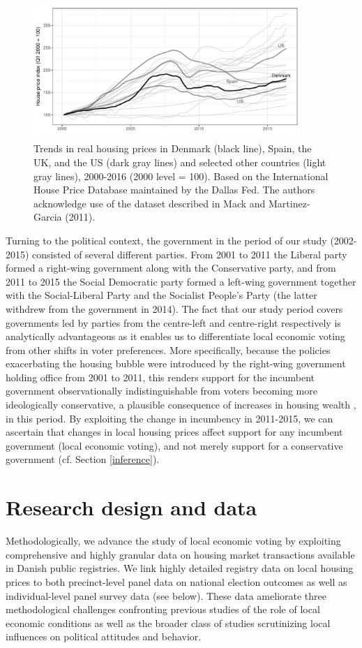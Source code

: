 \documentclass[12pt,a4paper]{article}
\begin{document}
	\begin{figure}[htbp!]
		\includegraphics[width=0.9\textwidth]{../figures/timeplot}
		\centering
		\caption{Trends in real housing prices in Denmark (black line), Spain, the UK, and the US (dark gray lines) and selected other countries (light gray lines), 2000-2016 (2000 level = 100). Based on the International House Price Database maintained by the Dallas Fed. The authors acknowledge use of the dataset described in Mack and Martinez-Garcia (2011).}\label{hpd}
	\end{figure}
	Turning to the political context, the government in the period of our study (2002-2015) consisted of several different parties. From 2001 to 2011 the Liberal party formed a right-wing government along with the Conservative party, and from 2011 to 2015 the Social Democratic party formed a left-wing government together with the Social-Liberal Party and the Socialist People’s Party (the latter withdrew from the government in 2014). The fact that our study period covers governments led by parties from the centre-left and centre-right respectively is analytically advantageous as it enables us to differentiate local economic voting from other shifts in voter preferences. More specifically, because the policies exacerbating the housing bubble were introduced by the right-wing government holding office from 2001 to 2011, this renders support for the incumbent government observationally indistinguishable from voters becoming more ideologically conservative, a plausible consequence of increases in housing wealth \citep{ansell2014political}, in this period. By exploiting the change in incumbency in 2011-2015, we can ascertain that changes in local housing prices affect support for any incumbent government (local economic voting), and not merely support for a conservative government (cf. Section \ref{inference}). 
	
	\section{Research design and data}\label{resdesign}
	Methodologically, we advance the study of local economic voting by exploiting comprehensive and highly granular data on housing market transactions available in Danish public registries. We link highly detailed registry data on local housing prices to both precinct-level panel data on national election outcomes as well as individual-level panel survey data (see below). These data ameliorate three methodological challenges confronting previous studies of the role of local economic conditions as well as the broader class of studies scrutinizing local influences on political attitudes and behavior.
	
\end{document}
